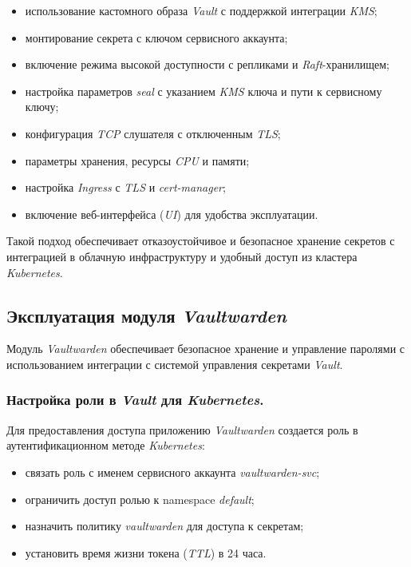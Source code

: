 \begin{itemize}
    \item использование кастомного образа \textit{Vault} с поддержкой интеграции \textit{KMS};
    \item монтирование секрета с ключом сервисного аккаунта;
    \item включение режима высокой доступности с репликами и \textit{Raft}-хранилищем;
    \item настройка параметров \textit{seal} с указанием \textit{KMS} ключа и пути к сервисному ключу;
    \item конфигурация \textit{TCP} слушателя с отключенным \textit{TLS};
    \item параметры хранения, ресурсы \textit{CPU} и памяти;
    \item настройка \textit{Ingress} с \textit{TLS} и \textit{cert-manager};
    \item включение веб-интерфейса (\textit{UI}) для удобства эксплуатации.
\end{itemize}

Такой подход обеспечивает отказоустойчивое и безопасное хранение секретов с интеграцией в облачную инфраструктуру и удобный доступ из кластера \textit{Kubernetes}.



\subsection{Эксплуатация модуля \textit{Vaultwarden}}

Модуль \textit{Vaultwarden} обеспечивает безопасное хранение и управление паролями с использованием интеграции с системой управления секретами \textit{Vault}.

\subsubsection{Настройка роли в \textit{Vault} для \textit{Kubernetes}.} Для предоставления доступа приложению \textit{Vaultwarden} создается роль в аутентификационном методе \textit{Kubernetes}:

\begin{itemize}
    \item связать роль с именем сервисного аккаунта \textit{vaultwarden-svc};
    \item ограничить доступ ролью к namespace \textit{default};
    \item назначить политику \textit{vaultwarden} для доступа к секретам;
    \item установить время жизни токена (\textit{TTL}) в 24 часа.
\end{itemize}

